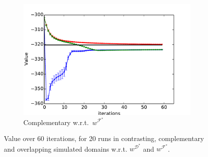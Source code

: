 \documentclass{aamas2016}
\newcommand{\jm}[1]{\textcolor{blue}{Joao: #1}}
\newcommand{\jm}[1]{}
\begin{document}
\begin{figure}[t]
\begin{subfigure}[t]{0.55\columnwidth}
    \includegraphics[trim=0.6cm 0.0cm 0.0cm 0.0cm,clip=true,width=1.45\textwidth]{images/taboo_apprentice_complementary.pdf}
     \caption{Complementary w.r.t.\ $w^{\mathcal{F}^*}$}
    \label{fig:toy_taboo_apprentice_complementary}
    \end{subfigure}
  \caption{Value over 60 iterations, for 20 runs in contrasting, complementary and overlapping simulated domains w.r.t. $w^{\mathcal{D}^*}$ and $w^{\mathcal{F}^*}$.}
  \label{fig:complementary}

\end{figure}

\end{document}
